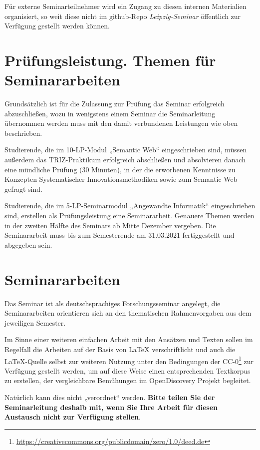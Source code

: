 \documentclass[11pt,a4paper]{article}
\begin{document}
Für externe Seminarteilnehmer wird ein Zugang zu diesen internen Materialien
organisiert, so weit diese nicht im github-Repo \emph{Leipzig-Seminar}
öffentlich zur Verfügung gestellt werden können.

\section{Prüfungsleistung. Themen für Seminararbeiten}

Grundsätzlich ist für die Zulassung zur Prüfung das Seminar erfolgreich
abzuschließen, wozu in wenigstens einem Seminar die Seminarleitung übernommen
werden muss mit den damit verbundenen Leistungen wie oben beschrieben.

Studierende, die im 10-LP-Modul „Semantic Web“ eingeschrieben sind, müssen
außerdem das TRIZ-Praktikum erfolgreich abschließen und absolvieren danach
eine mündliche Prüfung (30 Minuten), in der die erworbenen Kenntnisse zu
Konzepten Systematischer Innovationsmethodiken sowie zum Semantic Web gefragt
sind.

Studierende, die im 5-LP-Seminarmodul „Angewandte Informatik“ eingeschrieben
sind, erstellen als Prüfungsleistung eine Seminararbeit. Genauere Themen
werden in der zweiten Hälfte des Seminars ab Mitte Dezember vergeben. Die
Seminararbeit muss bis zum Semesterende am 31.03.2021 fertiggestellt und
abgegeben sein. 

\section{Seminararbeiten}

Das Seminar ist als deutschsprachiges Forschungsseminar angelegt, die
Seminararbeiten orientieren sich an den thematischen Rahmenvorgaben aus dem
jeweiligen Semester.

Im Sinne einer weiteren einfachen Arbeit mit den Ansätzen und Texten sollen im
Regelfall die Arbeiten auf der Basis von {\LaTeX} verschriftlicht und auch die
\LaTeX-Quelle selbst zur weiteren Nutzung unter den Bedingungen der
CC-0\footnote{\url{https://creativecommons.org/publicdomain/zero/1.0/deed.de}}
zur Verfügung gestellt werden, um auf diese Weise einen entsprechenden
Textkorpus zu erstellen, der vergleichbare Bemühungen im OpenDiscovery Projekt
begleitet.

Natürlich kann dies nicht „verordnet“ werden. \textbf{Bitte teilen Sie der
  Seminarleitung deshalb mit, wenn Sie Ihre Arbeit für diesen Austausch nicht
  zur Verfügung stellen}.  
\end{document}
